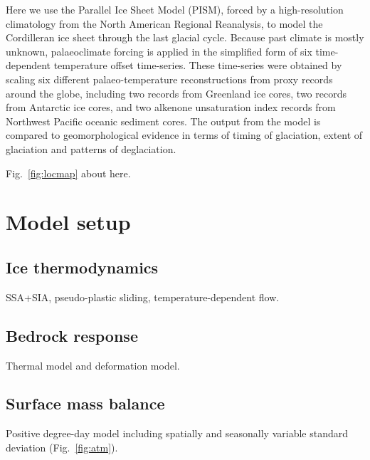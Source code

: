 \documentclass[tc, ms]{copernicus}
\begin{document}
Here we use the Parallel Ice Sheet Model (PISM), forced by a high-resolution
climatology from the North American Regional Reanalysis, to model the
Cordilleran ice sheet through the last glacial cycle. Because past climate
is mostly unknown, palaeoclimate forcing is applied in the simplified form of
six time-dependent temperature offset time-series. These time-series were
obtained by scaling six different palaeo-temperature reconstructions from
proxy records around the globe, including two  records from
Greenland ice cores, two  records from Antarctic ice cores,
and two alkenone unsaturation index records from Northwest Pacific oceanic
sediment cores. The output from the model is compared to geomorphological
evidence in terms of timing of glaciation, extent of glaciation and patterns
of deglaciation.


Fig.~\ref{fig:locmap} about here.

\section{Model setup}
\label{sec:model}

\subsection{Ice thermodynamics}

SSA+SIA, pseudo-plastic sliding, temperature-dependent flow.

\subsection{Bedrock response}

Thermal model and deformation model.

\subsection{Surface mass balance}

Positive degree-day model including spatially and seasonally variable standard
deviation (Fig.~\ref{fig:atm}).
\end{document}
